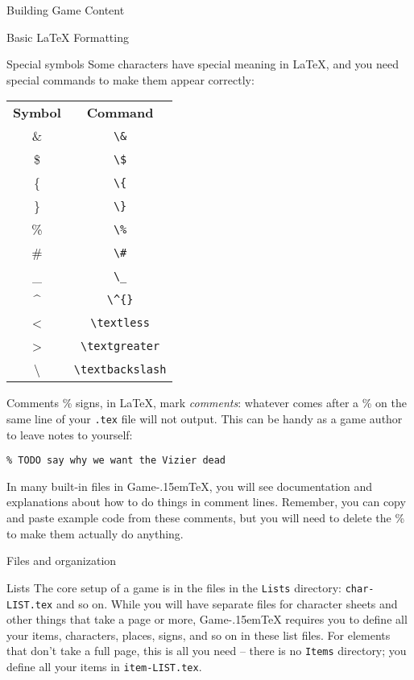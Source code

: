 \documentclass[11pt,  total={6in, 8in}]{article}
\def\gametex{\mbox{Game\kern-.15em\TeX}}
\begin{document}
\begin{section}{Building Game Content}
\begin{subsection}{Basic \LaTeX{} Formatting}
\begin{subsubsection}{Special symbols}
Some characters have special meaning in \LaTeX{}, and you need special commands to make them appear correctly:

\begin{tabular}{c c}
 \textbf{Symbol} & \textbf{Command} \\
 \& & \lstinline|\&| \\
 \$ & \lstinline|\$| \\
 \{ & \lstinline|\{| \\
 \} & \lstinline|\}| \\
 \% & \lstinline|\%| \\
 \# & \lstinline|\#| \\
 \_ & \lstinline|\_| \\
 \^{} & \lstinline|\^{}| \\
 \textless & \lstinline|\textless| \\
 \textgreater & \lstinline|\textgreater| \\
 \textbackslash & \lstinline|\textbackslash|
\end{tabular}
\end{subsubsection}
\begin{subsubsection}{Comments}
\% signs, in \LaTeX{}, mark \textit{comments}: whatever comes after a \% on the same line of your \texttt{.tex} file will not output.  This can be handy as a game author to leave notes to yourself:
\begin{verbatim}
% TODO say why we want the Vizier dead
\end{verbatim}
In many built-in files in \gametex{}, you will see documentation and explanations about how to do things in comment lines.  Remember, you can copy and paste example code from these comments, but you will need to delete the \% to make them actually do anything.
\end{subsubsection}
\end{subsection}
\begin{subsection}{Files and organization}
\begin{subsubsection}{Lists}
The core setup of a game is in the files in the \lstinline{Lists} directory: \lstinline{char-LIST.tex} and so on.
While you will have separate files for character sheets and other things that take a page or more, \gametex{} requires you to define all your items, characters, places, signs, and so on in these list files.
For elements that don't take a full page, this is all you need -- there is no \texttt{Items} directory; you define all your items in \lstinline{item-LIST.tex}.


\end{subsubsection}
\end{subsection}
\end{section}
\end{document}
